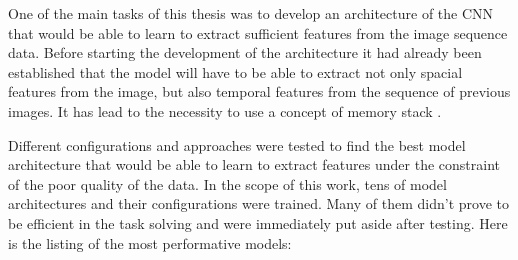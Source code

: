 One of the main tasks of this thesis was to develop an architecture of the CNN that would be able to learn to extract sufficient features from the image sequence data. Before starting the development of the architecture it had already been established that the model will have to be able to extract not only spacial features from the image, but also temporal features from the sequence of previous images. It has lead to the necessity to use a concept of memory stack \autocite{schneeberger2024end} \autocite{schaller2023train}.

Different configurations and approaches were tested to find the best model architecture that would be able to learn to extract features under the constraint of the poor quality of the data. In the scope of this work, tens of model architectures and their configurations were trained. Many of them didn't prove to be efficient in the task solving and were immediately put aside after testing. Here is the listing of the most performative models:

